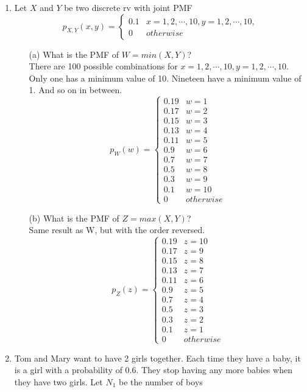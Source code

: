 \documentclass{report}
\begin{document}
\begin{enumerate}
\item Let $X$ and $Y$ be two discrete rv with joint PMF
$$ p_{X,Y}(x,y) = \left. \begin{cases}
0.1 & x = 1, 2, \cdots , 10, y = 1, 2, \cdots , 10, \\
0 & otherwise
\end{cases} \right.$$
\begin{itemize}
\item[(a)] What is the PMF of $W = min(X,Y)$? \\
There are 100 possible combinations for $x = 1, 2, \cdots , 10, y = 1, 2, \cdots , 10$. Only one has a minimum value of 10. Nineteen have a minimum value of 1. And so on in between.
$$ p_W(w) = \left. \begin{cases}
0.19 & w = 1 \\
0.17 & w = 2 \\
0.15 & w = 3 \\
0.13 & w = 4 \\
0.11 & w = 5 \\
0.9 & w = 6 \\
0.7 & w = 7 \\
0.5 & w = 8 \\
0.3 & w = 9 \\
0.1 & w = 10 \\
0 & otherwise
\end{cases} \right.$$
\item[(b)] What is the PMF of $Z = max(X,Y)$?\\
Same result as W, but with the order reversed.
$$ p_Z(z) = \left. \begin{cases}
0.19 & z = 10 \\
0.17 & z = 9 \\
0.15 & z = 8 \\
0.13 & z = 7 \\
0.11 & z = 6 \\
0.9 & z = 5 \\
0.7 & z = 4 \\
0.5 & z = 3 \\
0.3 & z = 2 \\
0.1 & z = 1 \\
0 & otherwise
\end{cases} \right.$$
\end{itemize}
\item Tom and Mary want to have 2 girls together. Each time they have a baby, it is a girl with a probability
of 0.6. They stop having any more babies when they have two girls. Let $N_1$ be the number of boys

\end{enumerate}
\end{document}
